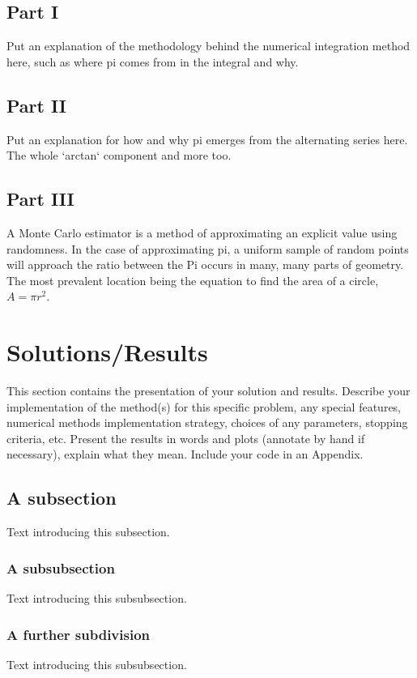 \documentclass[11pt]{article}
\begin{document}
\subsection{Part I}\label{S:3.1}
Put an explanation of the methodology behind the numerical integration method here, such as where pi comes from in the integral and why.

\subsection{Part II}\label{S:3.2}
Put an explanation for how and why pi emerges from the alternating series here. The whole `arctan` component and more too.

\subsection{Part III}\label{S:3.3}
A Monte Carlo estimator is a method of approximating an explicit value using randomness. In the case of approximating pi, a uniform sample of random points will approach the ratio between the
Pi occurs in many, many parts of geometry. The most prevalent location being the equation to find the area of a circle, $A=\pi r^2$.


\section{Solutions/Results}\label{S:4}
This section contains the presentation of your solution and results.
Describe your implementation of the method(s) for this specific problem, any special features, numerical methods implementation  strategy, choices of any parameters, stopping criteria, etc.
Present the results in words and plots (annotate by hand if necessary), explain what they mean. Include your code in an Appendix. 

\subsection{A subsection}
%
Text introducing this subsection. 

\subsubsection{A subsubsection}
%
Text introducing this subsubsection. 

\subsubsection{A further subdivision}
%
Text introducing this subsubsection. 
\end{document}
